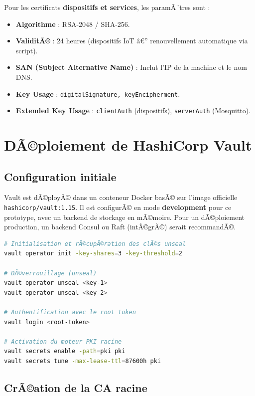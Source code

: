 Pour les certificats \textbf{dispositifs et services}, les paramÃ¨tres sont :
\begin{itemize}
  \item \textbf{Algorithme} : RSA-2048 / SHA-256.
  \item \textbf{ValiditÃ©} : 24 heures (dispositifs IoT â€” renouvellement automatique via script).
  \item \textbf{SAN (Subject Alternative Name)} : Inclut l'IP de la machine et le nom DNS.
  \item \textbf{Key Usage} : \texttt{digitalSignature, keyEncipherment}.
  \item \textbf{Extended Key Usage} : \texttt{clientAuth} (dispositifs), \texttt{serverAuth} (Mosquitto).
\end{itemize}

\section{DÃ©ploiement de HashiCorp Vault}

\subsection{Configuration initiale}

Vault est dÃ©ployÃ© dans un conteneur Docker basÃ© sur l'image officielle \texttt{hashicorp/vault:1.15}. Il est configurÃ© en mode \textbf{development} pour ce prototype, avec un backend de stockage en mÃ©moire. Pour un dÃ©ploiement production, un backend Consul ou Raft (intÃ©grÃ©) serait recommandÃ©.

\begin{lstlisting}[language=bash, caption=Initialisation de Vault et activation du moteur PKI]
# Initialisation et rÃ©cupÃ©ration des clÃ©s unseal
vault operator init -key-shares=3 -key-threshold=2

# DÃ©verrouillage (unseal)
vault operator unseal <key-1>
vault operator unseal <key-2>

# Authentification avec le root token
vault login <root-token>

# Activation du moteur PKI racine
vault secrets enable -path=pki pki
vault secrets tune -max-lease-ttl=87600h pki
\end{lstlisting}

\subsection{CrÃ©ation de la CA racine}

